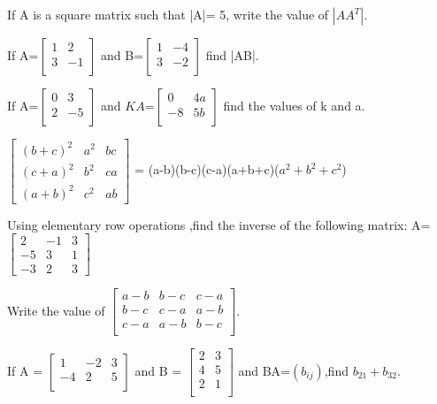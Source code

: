 \item If A is a square matrix such that |A|= 5, write the value of $|AA^T|$.
\item If A=$\begin{bmatrix}
1&2\\3&-1\\ 
 \end{bmatrix}$ 
 and 
 B=$\begin{bmatrix}
 1&-4\\3&-2\\
 \end{bmatrix} $ 
 find |AB|.\\
 
 \item If A=$\begin{bmatrix}
 0&3\\2&-5\\ 
 \end{bmatrix}$
  and $KA$=$\begin{bmatrix}0&4a\\-8&5b\\\end{bmatrix} $ find the values of k and a.\\
 \item $\begin{bmatrix}(b+c)^{2}&a^{2}&bc\\(c+a)^{2}&b^{2}&ca\\(a+b)^{2}&c^{2}&ab \end{bmatrix}$ = (a-b)(b-c)(c-a)(a+b+c)($a^{2}+b^{2}+c^{2}$)
\item Using elementary row operations ,find the inverse of the following matrix:
A=$\begin{bmatrix} 2&-1&3\\-5&3&1\\-3&2&3
 \end{bmatrix}$
   
 \item Write the value of  $\begin{bmatrix} a-b & b-c & c-a \\ b-c & c-a & a-b \\ c-a & a-b & b-c \\ \end{bmatrix}$.

  \item If A = $\begin{bmatrix} 1 & -2 & 3 \\-4  & 2  & 5\\ \end{bmatrix} $ and B = $\begin{bmatrix} 2 & 3 \\ 4 & 5 \\ 2 & 1 \\ \end{bmatrix}$ and BA=$(b_{ij})$,find $b_{21}+b_{32}.$

